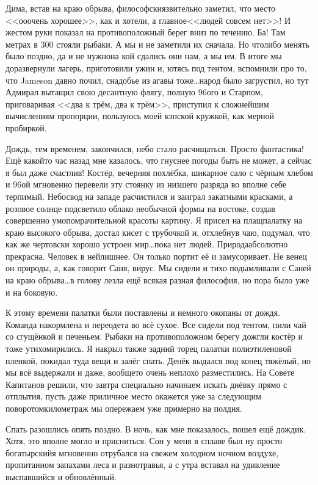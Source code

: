 Дима, встав на краю обрыва, философски\sdash язвительно заметил, что место <<о\sdash о\sdash очень хорошее>>, как и хотели, а главное\mdash <<людей совсем нет>>! И жестом руки показал на противоположный берег вниз по течению. Ба! Там метрах в 300 стояли рыбаки. А мы и не заметили их сначала. Но что\sdash либо менять было поздно, да и не нужно\mdash на кой сдались они нам, а мы им. В итоге мы доразвернули лагерь, приготовили ужин и, ютясь под тентом, вспомнили про то, что Jameson давно почил, снадобье из агавы тоже\ldots  народ было загрустил, но тут Адмирал вытащил свою десантную флягу, полную 96\sdash ого и Старпом, приговаривая <<два к трём, два к трём>>, приступил к сложнейшим вычислениям пропорции, пользуюсь моей кэпской кружкой, как мерной пробиркой. 

Дождь, тем временем, закончился, небо стало расчищаться. Просто фантастика! Ещё какой\sdash то час назад мне казалось, что гнуснее погоды быть не может, а сейчас я был даже счастлив! Костёр, вечерняя похлёбка, шикарное сало с чёрным хлебом и 96\sdash ой мгновенно перевели эту стоянку из низшего разряда во вполне себе терпимый. Небосвод на западе расчистился и заиграл закатными красками, а розовое солнце подсветило облако необычной формы на востоке, создав совершенно умопомрачительной красоты картину. Я присел на плащ\sdash палатку на краю высокого обрыва, достал кисет с трубочкой и, отхлебнув чаю, подумал, что как же чертовски хорошо устроен мир\ldots  пока нет людей. Природа\mdash абсолютно прекрасна. Человек в ней\mdash лишнее. Он только портит её и замусоривает. Не венец он природы, а, как говорит Саня, вирус. Мы сидели и тихо подымливали с Саней на краю обрыва\ldots  в голову лезла ещё всякая разная философия, но пора было уже и на боковую. 

К этому времени палатки были поставлены и немного окопаны от дождя. Команда накормлена и переодета во всё сухое. Все сидели под тентом, пили чай со сгущёнкой и печеньем. Рыбаки на противоположном берегу дожгли костёр и тоже утихомирились. Я накрыл также задний торец палатки полиэтиленовой пленкой, покидал туда вещи и залёг спать. Денёк выдался под конец тяжёлый, но мы всё выдержали и даже, вообще\sdash то очень неплохо разместились. На Совете Капитанов решили, что завтра специально начинаем искать днёвку прямо с отплытия, пусть даже приличное место окажется уже за следующим поворотом\mdash километраж мы опережаем уже примерно на полдня. 

Спать разошлись опять поздно. В ночь, как мне показалось, пошел ещё дождик. Хотя, это вполне могло и присниться. Сон у меня в сплаве был ну просто богатырский\mdash я мгновенно отрубался на свежем холодном ночном воздухе, пропитанном запахами леса и разнотравья, а с утра вставал на удивление выспавшийся и обновлённый.

\begin{center}
\end{center}
